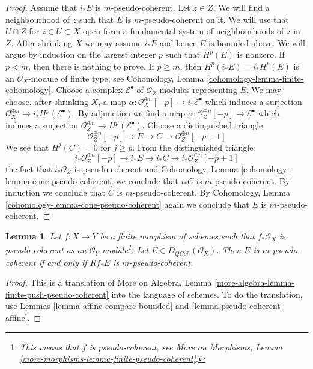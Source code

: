 \documentclass{stacks-project}
\theoremstyle{plain}
\newtheorem{lemma}[subsection]{Lemma}
\theoremstyle{definition}
\theoremstyle{remark}
\numberwithin{equation}{subsection}
\def\QCoh{\mathit{QCoh}}
\begin{document}
\begin{proof}
\medskip\noindent
Assume that $i_*E$ is $m$-pseudo-coherent. Let $z \in Z$.
We will find a neighbourhood of $z$ such that $E$
is $m$-pseudo-coherent on it. We will use
that $U \cap Z$ for $z \in U \subset X$ open form a fundamental system of
neighbourhoods of $z$ in $Z$. After shrinking $X$ we may assume $i_*E$
and hence $E$ is bounded above. We will argue by induction on
the largest integer $p$ such that $H^p(E)$ is nonzero. If $p < m$, then
there is nothing to prove. If $p \geq m$, then $H^p(i_*E) = i_*H^p(E)$
is an $\mathcal{O}_X$-module of finite type, see
Cohomology, Lemma \ref{cohomology-lemma-finite-cohomology}.
Choose a complex $\mathcal{E}^\bullet$ of $\mathcal{O}_Z$-modules
representing $E$. We may choose, after shrinking $X$,
a map $\alpha : \mathcal{O}_X^{\oplus n}[-p] \to i_*\mathcal{E}^\bullet$
which induces a surjection
$\mathcal{O}_X^{\oplus n} \to i_*H^p(\mathcal{E}^\bullet)$.
By adjunction we find a map
$\alpha : \mathcal{O}_Z^{\oplus n}[-p] \to \mathcal{E}^\bullet$
which induces a surjection
$\mathcal{O}_Z^{\oplus n} \to H^p(\mathcal{E}^\bullet)$.
Choose a distinguished triangle
$$
\mathcal{O}_Z^{\oplus n}[-p] \to E \to C \to \mathcal{O}_Z^{\oplus n}[-p + 1]
$$
We see that $H^j(C) = 0$ for $j \geq p$. From the distinguished triangle
$$
i_*\mathcal{O}_Z^{\oplus n}[-p] \to i_*E \to i_*C \to
i_*\mathcal{O}_Z^{\oplus n}[-p + 1]
$$
the fact that $i_*\mathcal{O}_Z$ is pseudo-coherent
and 
Cohomology, Lemma \ref{cohomology-lemma-cone-pseudo-coherent}
we conclude that $i_*C$ is $m$-pseudo-coherent.
By induction we conclude that $C$ is $m$-pseudo-coherent.
By Cohomology, Lemma \ref{cohomology-lemma-cone-pseudo-coherent}
again we conclude that $E$ is $m$-pseudo-coherent.
\end{proof}

\begin{lemma}
\label{lemma-finite-push-pseudo-coherent}
Let $f : X \to Y$ be a finite morphism of schemes such that
$f_*\mathcal{O}_X$ is pseudo-coherent as an
$\mathcal{O}_Y$-module\footnote{This means that $f$ is pseudo-coherent, see
More on Morphisms, Lemma
\ref{more-morphisms-lemma-finite-pseudo-coherent}.}.
Let $E \in D_\QCoh(\mathcal{O}_X)$. Then $E$ is $m$-pseudo-coherent
if and only if $Rf_*E$ is $m$-pseudo-coherent.
\end{lemma}

\begin{proof}
This is a translation of
More on Algebra, Lemma \ref{more-algebra-lemma-finite-push-pseudo-coherent}
into the language of schemes. To do the translation, use
Lemmas \ref{lemma-affine-compare-bounded} and
\ref{lemma-pseudo-coherent-affine}.
\end{proof}
\end{document}
